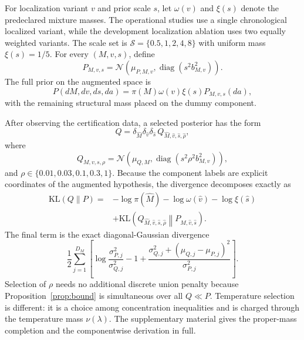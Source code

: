 For localization variant $v$ and prior scale $s$, let $\omega(v)$ and $\xi(s)$ denote the predeclared mixture masses. The operational studies use a single chronological localized variant, while the development localization ablation uses two equally weighted variants. The scale set is $\mathcal S=\{0.5,1,2,4,8\}$ with uniform mass $\xi(s)=1/5$. For every $(M,v,s)$, define
\begin{equation}
P_{M,v,s}=\mathcal N\!\left(\mu_{P,M,v},\operatorname{diag}(s^2b_{M,v}^2)\right).
\label{eq:prior_gauss}
\end{equation}
The full prior on the augmented space is
\begin{equation}
P(dM,dv,ds,da)=\pi(M)\omega(v)\xi(s)P_{M,v,s}(da),
\label{eq:joint_prior}
\end{equation}
with the remaining structural mass placed on the dummy component.

After observing the certification data, a selected posterior has the form
\begin{equation}
Q=\delta_{\widehat M}\delta_{\widehat v}\delta_{\widehat s}\,
Q_{\widehat M,\widehat v,\widehat s,\widehat\rho},
\label{eq:joint_posterior}
\end{equation}
where
\begin{equation}
Q_{M,v,s,\rho}=\mathcal N\!\left(\mu_{Q,M},\operatorname{diag}(s^2\rho^2b_{M,v}^2)\right),
\label{eq:posterior_gauss}
\end{equation}
and $\rho\in\{0.01,0.03,0.1,0.3,1\}$. Because the component labels are explicit coordinates of the augmented hypothesis, the divergence decomposes exactly as
\begin{align}
\mathrm{KL}(Q\|P)
={}&-\log\pi(\widehat M)-\log\omega(\widehat v)-\log\xi(\widehat s)\nonumber\\
&+\mathrm{KL}\!\left(Q_{\widehat M,\widehat v,\widehat s,\widehat\rho}\middle\|P_{\widehat M,\widehat v,\widehat s}\right).
\label{eq:joint_kl}
\end{align}
The final term is the exact diagonal-Gaussian divergence
\begin{equation}
\frac12\sum_{j=1}^{D_M}\left[
\log\frac{\sigma_{P,j}^2}{\sigma_{Q,j}^2}-1+
\frac{\sigma_{Q,j}^2+(\mu_{Q,j}-\mu_{P,j})^2}{\sigma_{P,j}^2}
\right].
\label{eq:gaussian_kl}
\end{equation}
Selection of $\rho$ needs no additional discrete union penalty because Proposition~\ref{prop:bound} is simultaneous over all $Q\ll P$. Temperature selection is different: it is a choice among concentration inequalities and is charged through the temperature mass $\nu(\lambda)$. The supplementary material gives the proper-mass completion and the componentwise derivation in full.

